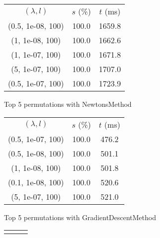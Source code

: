 \begin{figure}[H]
\label{fig:param_comp_NegativeEntropy_NewtonsSearch}
\begin{subfigure}[ht]{.5\textwidth}
\begin{tabular}{|c|c|c|}
\hline
\rowcolor{gray!25}
\multicolumn{3}{|c|}{NewtonsMethod} \\
\hline
\rowcolor{gray!25}
$(\lambda,l)$ & $s$ (\%) & $t$ (ms) \\
\hline
(0.5, 1e-08, 100) & 100.0 & 1659.8 \\
(1, 1e-08, 100) & 100.0 & 1662.6 \\
(1, 1e-07, 100) & 100.0 & 1671.8 \\
(5, 1e-07, 100) & 100.0 & 1707.0 \\
(0.5, 1e-07, 100) & 100.0 & 1723.9 \\
\hline
\end{tabular}
\caption{Top 5 permutations with NewtonsMethod}
\label{subfig:param_comp_NegativeEntropy_NewtonsMethod_NewtonsSearch}
\end{subfigure}
\hfill
\begin{subfigure}[ht]{.5\textwidth}
\begin{tabular}{|c|c|c|}
\hline
\rowcolor{gray!25}
\multicolumn{3}{|c|}{GradientDescentMethod} \\
\hline
\rowcolor{gray!25}
$(\lambda,l)$ & $s$ (\%) & $t$ (ms) \\
\hline
(0.5, 1e-07, 100) & 100.0 & 476.2 \\
(0.5, 1e-08, 100) & 100.0 & 501.1 \\
(1, 1e-08, 100) & 100.0 & 501.8 \\
(0.1, 1e-08, 100) & 100.0 & 520.6 \\
(5, 1e-07, 100) & 100.0 & 521.0 \\
\hline
\end{tabular}
\caption{Top 5 permutations with GradientDescentMethod}
\label{subfig:param_comp_NegativeEntropy_GradientDescentMethod_NewtonsSearch}
\end{subfigure}
\hfill
\begin{subfigure}[ht]{.5\textwidth}
\begin{tabular}{|c|c|c|}
\hline
\rowcolor{gray!25}
\multicolumn{3}{|c|}{ConjugateGradientMethod} \\

\end{tabular}
\end{subfigure}
\end{figure}
